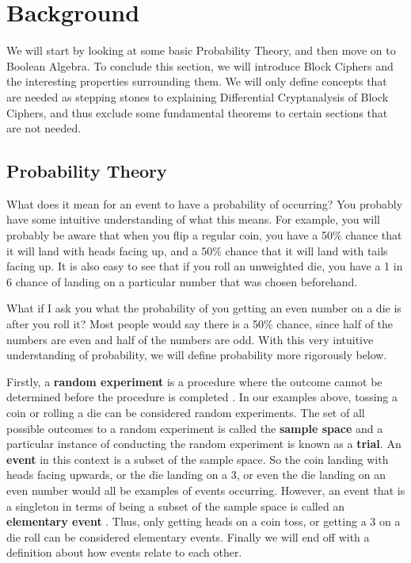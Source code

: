 



\chapter{Background} \label{c:background}

We will start by looking at some basic Probability Theory, and then move on to
Boolean Algebra. To conclude this section, we will introduce Block Ciphers and
the interesting properties surrounding them. We will only define concepts that
are needed as stepping stones to explaining Differential Cryptanalysis of Block
Ciphers, and thus exclude some fundamental theorems to certain sections that
are not needed. 

\section{Probability Theory}

What does it mean for an event to have a probability of occurring? You probably
have some intuitive understanding of what this means. For example, you will
probably be aware that when you flip a regular coin, you have a 50\% chance
that it will land with heads facing up, and a 50\% chance that it will land
with tails facing up. It is also easy to see that if you roll an unweighted
die, you have a 1 in 6 chance of landing on a particular number that was chosen
beforehand.

What if I ask you what the probability of you getting an even number on a die
is after you roll it? Most people would say there is a 50\% chance, since half
of the numbers are even and half of the numbers are odd. With this very
intuitive understanding of probability, we will define probability more
rigorously below.

Firstly, a \textbf{random experiment} is a procedure where the outcome cannot
be determined before the procedure is completed \cite[p.~57]{IntroStat}. In our
examples above, tossing a coin or rolling a die can be considered random
experiments.  The set of all possible outcomes to a random experiment is called
the \textbf{sample space} and a particular instance of conducting the random
experiment is known as a \textbf{trial}. An \textbf{event} in this context is a
subset of the sample space. So the coin landing with heads facing upwards, or
the die landing on a 3, or even the die landing on an even number would all be
examples of events occurring. However, an event that is a singleton in terms of
being a subset of the sample space is called an \textbf{elementary event} .
Thus, only getting heads on a coin toss, or getting a 3 on a die roll can be
considered elementary events. Finally we will end off with a definition about
how events relate to each other.

